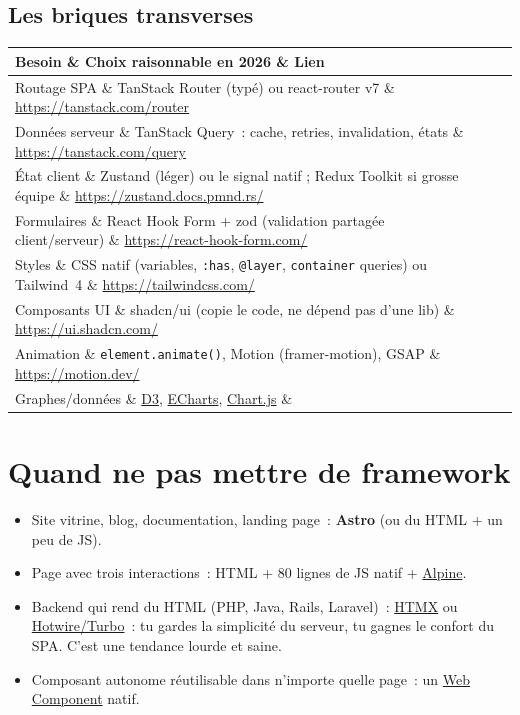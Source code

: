 \documentclass[12pt,a4paper,twoside,openright]{book}
\makeatletter
\newcommand{\link}[2]{\href{#2}{#1}}
\newenvironment{tabz}[1]{\rowcolors{2}{white}{tralight}%
  \small\setlength{\tabcolsep}{5pt}\setlength{\LTpre}{3pt}\setlength{\LTpost}{3pt}%
  \begin{longtable}{@{}#1@{}}\toprule}
  {\bottomrule\end{longtable}\normalfont\setlength{\tabcolsep}{6pt}}
\newcommand{\thd}[1]{\textbf{\color{white}#1}}
\newcommand{\headrow}{\rowcolor{theadbg}}
\makeatother
\begin{document}
\subsection{Les briques transverses}

\begin{tabz}{lXl}
  \headrow \thd{Besoin} \& \thd{Choix raisonnable en 2026} \& \thd{Lien} \\
  \midrule
  Routage SPA \& TanStack Router (typ\'e) ou react-router v7 \& \url{https://tanstack.com/router} \\
  Donn\'ees serveur \& TanStack Query~: cache, retries, invalidation, \'etats \& \url{https://tanstack.com/query} \\
  \'Etat client \& Zustand (l\'eger) ou le signal natif ; Redux Toolkit si grosse \'equipe \& \url{https://zustand.docs.pmnd.rs/} \\
  Formulaires \& React Hook Form + zod (validation partag\'ee client/serveur) \& \url{https://react-hook-form.com/} \\
  Styles \& CSS natif (variables, \verb|:has|, \verb|@layer|, \verb|container| queries) ou Tailwind~4 \& \url{https://tailwindcss.com/} \\
  Composants UI \& shadcn/ui (copie le code, ne d\'epend pas d'une lib) \& \url{https://ui.shadcn.com/} \\
  Animation \& \verb|element.animate()|, Motion (framer-motion), GSAP \& \url{https://motion.dev/} \\
  Graphes/donn\'ees \& \link{D3}{https://d3js.org/}, \link{ECharts}{https://echarts.apache.org/}, \link{Chart.js}{https://www.chartjs.org/} \& \\
\end{tabz}

\section{Quand ne pas mettre de framework}

\begin{itemize}
  \item Site vitrine, blog, documentation, landing page~: \textbf{Astro} (ou du HTML + un peu de JS).
  \item Page avec trois interactions~: HTML + 80 lignes de JS natif + \link{Alpine}{https://alpinejs.dev/}.
  \item Backend qui rend du HTML (PHP, Java, Rails, Laravel)~: \link{HTMX}{https://htmx.org/}
        ou \link{Hotwire/Turbo}{https://turbo.hotwired.dev/}~: tu gardes la simplicit\'e du serveur,
        tu gagnes le confort du SPA. C'est une tendance lourde et saine.
  \item Composant autonome r\'eutilisable dans n'importe quelle page~: un
        \link{Web Component}{https://developer.mozilla.org/fr/docs/Web/API/Web\_components} natif.
\end{itemize}
\end{document}
